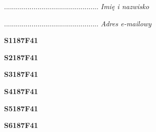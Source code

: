\begin{turn}{90}\begin{minipage}{\linewidth} \vspace{20mm} ................................................  \textit{Imię i nazwisko}\end{minipage}\end{turn}

\begin{turn}{90}\begin{minipage}{\linewidth} \vspace{20mm} ................................................  \textit{Adres e-mailowy}\end{minipage}\end{turn}

\begin{turn}{90}\huge \begin{minipage}{\linewidth} \vspace{10mm}\textbf{S1187F41}\end{minipage}\end{turn}

\begin{turn}{90}\huge \begin{minipage}{\linewidth} \vspace{10mm}\textbf{S2187F41}\end{minipage}\end{turn}

\begin{turn}{90}\huge \begin{minipage}{\linewidth} \vspace{10mm}\textbf{S3187F41}\end{minipage}\end{turn}

\begin{turn}{90}\huge \begin{minipage}{\linewidth} \vspace{10mm}\textbf{S4187F41}\end{minipage}\end{turn}

\begin{turn}{90}\huge \begin{minipage}{\linewidth} \vspace{10mm}\textbf{S5187F41}\end{minipage}\end{turn}

\begin{turn}{90}\huge \begin{minipage}{\linewidth} \vspace{10mm}\textbf{S6187F41}\end{minipage}\end{turn}

